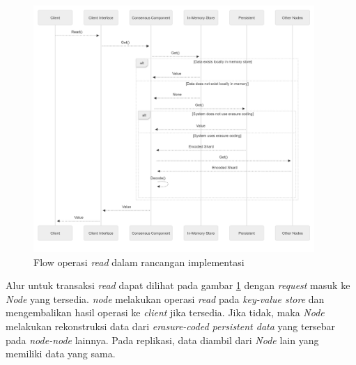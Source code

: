 \begin{figure}[!ht]
    \centering
    \includegraphics[width=0.95\textwidth]{resources/chapter-3/flow-read.png}
    \caption{Flow operasi \textit{read} dalam rancangan implementasi}
    \label{fig:flow-read-mermaidjs}
\end{figure}

Alur untuk transaksi \textit{read} dapat dilihat pada gambar \ref{fig:flow-read-mermaidjs} dengan \textit{request} masuk ke \textit{Node} yang tersedia. \textit{node} melakukan operasi \textit{read} pada \textit{key-value store} dan mengembalikan hasil operasi ke \textit{client} jika tersedia. Jika tidak, maka \textit{Node} melakukan rekonstruksi data dari \textit{erasure-coded persistent data} yang tersebar pada \textit{node-node} lainnya. Pada replikasi, data diambil dari \textit{Node} lain yang memiliki data yang sama.